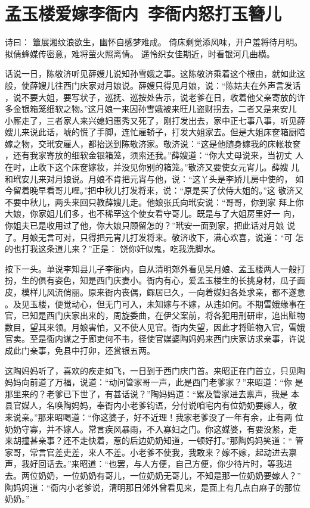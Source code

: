 \chapter{孟玉楼爱嫁李衙内~李衙内怒打玉簪儿}

诗曰：
簟展湘纹浪欲生，幽怀自感梦难成。
倚床剩觉添风味，开户羞将待月明。
拟倩蜂媒传密意，难将萤火照离情。
遥怜织女佳期近，时看银河几曲横。

话说一日，陈敬济听见薛嫂儿说知孙雪娥之事。这陈敬济乘着这个根由，就如此这
般，使薛嫂儿往西门庆家对月娘说。薛嫂只得见月娘，说：“陈姑夫在外声言发话
，说不要大姐，要写状子，巡抚、巡按处告示，说老爹在日，收着他父亲寄放的许
多金银箱笼细软之物。”这月娘一来因孙雪娥被来旺儿盗财拐去，二者又是来安儿
小厮走了，三者家人来兴媳妇惠秀又死了，刚打发出去，家中正七事八事，听见薛
嫂儿来说此话，唬的慌了手脚，连忙雇轿子，打发大姐家去。但是大姐床奁箱厨陪
嫁之物，交玳安雇人，都抬送到陈敬济家。敬济说：“这是他随身嫁我的床帐妆奁
，还有我家寄放的细软金银箱笼，须索还我。”薛嫂道：“你大丈母说来，当初丈
人在时，止收下这个床奁嫁妆，并没见你别的箱笼。”敬济又要使女元宵儿。薛嫂
儿和玳安儿来对月娘说。月娘不肯把元宵与他，说：“这丫头是李娇儿房中使的，
如今留着晚早看哥儿哩。”把中秋儿打发将来，说：“原是买了伏侍大姐的。”这
敬济又不要中秋儿，两头来回只教薛嫂儿走。他娘张氏向玳安说：“哥哥，你到家
拜上你大娘，你家姐儿们多，也不稀罕这个使女看守哥儿。既是与了大姐房里好一
向，你姐夫已是收用过了他，你大娘只顾留怎的？”玳安一面到家，把此话对月娘
说了。月娘无言可对，只得把元宵儿打发将来。敬济收下，满心欢喜，说道：“可
怎的也打我这条道儿来？”正是：
饶你奸似鬼，吃我洗脚水。

按下一头。单说李知县儿子李衙内，自从清明郊外看见吴月娘、孟玉楼两人一般打
扮，生的俱有姿色，知是西门庆妻小。衙内有心，爱孟玉楼生的长挑身材，瓜子面
皮，模样儿风流俏丽。原来衙内丧偶，鳏居已久，一向着媒妇各处求亲，都不遂意
。及见玉楼，便觉动心，但无门可入，未知嫁与不嫁，从违如何。不期雪娥缘事在
官，已知是西门庆家出来的，周旋委曲，在伊父案前，将各犯用刑研审，追出赃物
数目，望其来领。月娘害怕，又不使人见官。衙内失望，因此才将赃物入官，雪娥
官卖。至是衙内谋之于廊吏何不韦，径使官媒婆陶妈妈来西门庆家访求亲事，许说
成此门亲事，免县中打卯，还赏银五两。

这陶妈妈听了，喜欢的疾走如飞，一日到于西门庆门首。来昭正在门首立，只见陶
妈妈向前道了万福，说道：“动问管家哥一声，此是西门老爹家？”来昭道：“你
是那里来的？老爹已下世了，有甚话说？”陶妈妈道：“累及管家进去禀声，我是
本县官媒人，名唤陶妈妈，奉衙内小老爹钧语，分付说咱宅内有位奶奶要嫁人，敬
来说亲。”那来昭喝道：“你这婆子，好不近理！我家老爹没了一年有余，止有两
位奶奶守寡，并不嫁人。常言疾风暴雨，不入寡妇之门。你这媒婆，有要没紧，走
来胡撞甚亲事？还不走快着，惹的后边奶奶知道，一顿好打。”那陶妈妈笑道：“
管家哥，常言官差吏差，来人不差。小老爹不使我，我敢来？嫁不嫁，起动进去禀
声，我好回话去。”来昭道：“也罢，与人方便，自己方便，你少待片时，等我进
去。两位奶奶，一位奶奶有哥儿，一位奶奶无哥儿，不知是那一位奶奶要嫁人？”
陶妈妈道：“衙内小老爹说，清明那日郊外曾看见来，是面上有几点白麻子的那位
奶奶。”

